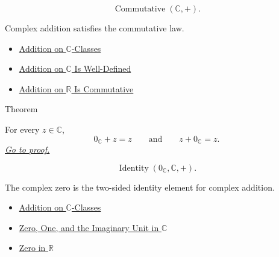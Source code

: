 \begin{remark*}
\[
\operatorname{Commutative}(\mathbb{C},+).
\]
\end{remark*}

\begin{remark*}[Interpretation]
Complex addition satisfies the commutative law.
\end{remark*}

\begin{dependencies}
\begin{itemize}
  \item \hyperref[def:addition-on-c-classes]{Addition on $\mathbb{C}$-Classes}
  \item \hyperref[thm:addition-on-c-well-defined]{Addition on $\mathbb{C}$ Is Well-Defined}
  \item \hyperref[thm:addition-on-r-commutative]{Addition on $\mathbb{R}$ Is Commutative}
\end{itemize}
\end{dependencies}

\begin{theorembox}{Theorem}
\begin{theorem}
\label{thm:zero-additive-identity-on-c}
For every \(z\in\mathbb{C}\),
\[
0_{\mathbb{C}}+z=z
\qquad\text{and}\qquad
z+0_{\mathbb{C}}=z.
\]
\hyperref[prf:zero-additive-identity-on-c]{\textit{Go to proof.}}
\end{theorem}
\end{theorembox}


\begin{remark*}
\[
\operatorname{Identity}(0_{\mathbb{C}},\mathbb{C},+).
\]
\end{remark*}

\begin{remark*}[Interpretation]
The complex zero is the two-sided identity element for complex addition.
\end{remark*}

\begin{dependencies}
\begin{itemize}
  \item \hyperref[def:addition-on-c-classes]{Addition on $\mathbb{C}$-Classes}
  \item \hyperref[def:zero-one-i-in-c]{Zero, One, and the Imaginary Unit in $\mathbb{C}$}
  \item \hyperref[def:zero-in-r]{Zero in $\mathbb{R}$}
\end{itemize}
\end{dependencies}

